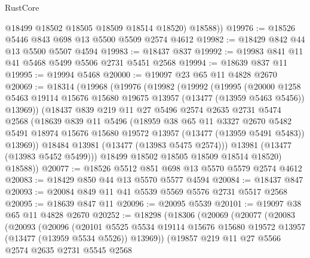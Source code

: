 \begin{lexlean}{RustCore}
\begin{coremodule}
          @18499
          @18502
          @18505
          @18509
          @18514
          @18520)
        @18588))
@19976 := @18526 @5446 @843 @698 @13 @5500 @5509 @2574 @4612
@19982 := @18429 @842 @44 @13 @5500 @5507 @4594
@19983 := @18437 @837
@19992 := @19983 @841 @11 @41 @5468 @5499 @5506 @2731 @5451 @2568
@19994 := @18639 @837 @11
@19995 := @19994 @5468
@20000 := @19097 @23 @65 @11 @4828 @2670
@20069 := @18314
    (@19968
      (@19976
        (@19982
          (@19992
            (@19995
              (@20000
                @1258
                @5463
                @19114
                @15676
                @15680
                @19675
                @13957
                (@13477 (@13959 @5463 @5456))
                @13969))
            (@18437
              @839
              @219
              @11
              @27
              @5496
              @2574
              @2635
              @2731
              @5474
              @2568
              (@18639
                @839
                @11
                @5496
                (@18959
                  @38
                  @65
                  @11
                  @3327
                  @2670
                  @5482
                  @5491
                  @18974
                  @15676
                  @15680
                  @19572
                  @13957
                  (@13477 (@13959 @5491 @5483))
                  @13969))
              @18484
              @13981
              (@13477 (@13983 @5475 @2574)))
            @13981
            (@13477 (@13983 @5452 @5499)))
          @18499
          @18502
          @18505
          @18509
          @18514
          @18520)
        @18588))
@20077 := @18526 @5512 @851 @698 @13 @5570 @5579 @2574 @4612
@20083 := @18429 @850 @44 @13 @5570 @5577 @4594
@20084 := @18437 @847
@20093 := @20084 @849 @11 @41 @5539 @5569 @5576 @2731 @5517 @2568
@20095 := @18639 @847 @11
@20096 := @20095 @5539
@20101 := @19097 @38 @65 @11 @4828 @2670
@20252 := @18298
    (@18306
      (@20069
        (@20077
          (@20083
            (@20093
              (@20096
                (@20101
                  @5525
                  @5534
                  @19114
                  @15676
                  @15680
                  @19572
                  @13957
                  (@13477 (@13959 @5534 @5526))
                  @13969))
              (@19857
                @219
                @11
                @27
                @5566
                @2574
                @2635
                @2731
                @5545
                @2568

\end{coremodule}
\end{lexlean}
